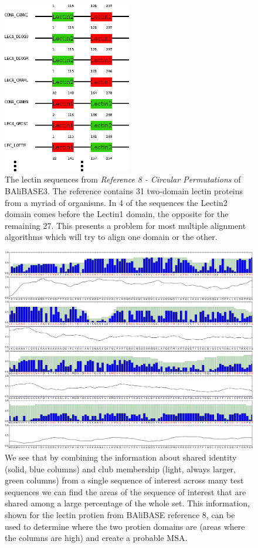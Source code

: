\documentclass[phd,tocprelim]{cornell}
\begin{document}
 \begin{figure}[htp]%
 \centerline{\includegraphics[width=0.5\textwidth]{figures/velvetrope/BAliBASEsnap2v2.png}}
 \caption[Multiple alignment reference]{The lectin sequences from \textit{Reference 8 - Circular Permutations} of BAliBASE3. The reference contains 31 two-domain lectin proteins from a myriad of organisms. In 4 of the sequences the Lectin2 domain comes before the Lectin1 domain, the opposite for the remaining 27. This presents a problem for most multiple alignment algorithms which will try to align one domain or the other.}
 	\label{fig:vr04}
 \end{figure}
 
 \begin{figure}[htp]%
 \centerline{\includegraphics[width=\textwidth]{figures/velvetrope/COMBO1.png}}
 \caption[Velvetrope per-base output]{We see that by combining the information about shared identity (solid, blue columns) and club membership
(light, always larger, green columns) from a single sequence of interest across many test sequences we can
ﬁnd the areas of the sequence of interest that are shared among a large percentage of the whole set. This
information, shown for the lectin protien from BAliBASE reference 8, can be used to determine where the
two protien domains are (areas where the columns are high) and create a probable MSA.}
 	\label{fig:vr05}
 \end{figure}
 
\end{document}
